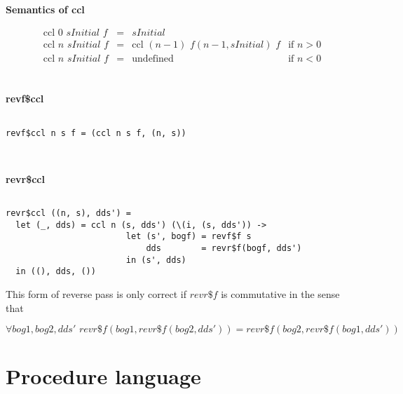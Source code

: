 \documentclass[sigplan,review]{acmart}
\newcommand{\lb}{\llbracket}
\newcommand{\rb}{\rrbracket}
\begin{document}
\begin{figure*}
  \begin{minipage}{\textwidth}
      {\bf Semantics of ccl}

      \newcommand{\gradS}[2]{\nabla_{#1}\lb #2 \rb}
      \newcommand{\gradV}[1]{\nabla#1}

\[
      \begin{array}{rcll}
        \mathrm{ccl} \,\, 0 \,\, sInitial \,\, f & = & sInitial \\
        \mathrm{ccl} \,\, n \,\, sInitial \,\, f & = &
        \mathrm{ccl} \,\, (n-1) \,\, f(n-1, sInitial) \,\, f & \textrm{if
          $n > 0$}\\
        \mathrm{ccl} \,\, n \,\, sInitial \,\, f & = &
        \mathrm{undefined} & \textrm{if $n < 0$}\\
      \end{array}
      \]
\\
\begin{minipage}{\textwidth}
      {\bf revf\$ccl}
\begin{verbatim}

revf$ccl n s f = (ccl n s f, (n, s))

\end{verbatim}
\end{minipage}
\\
\begin{minipage}{\textwidth}
      {\bf revr\$ccl}
\begin{verbatim}

revr$ccl ((n, s), dds') =
  let (_, dds) = ccl n (s, dds') (\(i, (s, dds')) ->
                        let (s', bogf) = revf$f s
                            dds        = revr$f(bogf, dds')
                        in (s', dds)
  in ((), dds, ())

\end{verbatim}

This form of reverse pass is only correct if $revr\$f$ is
commutative in the sense that

\[
\forall
bog1, bog2, dds' \,\,
revr\$f(bog1, revr\$f(bog2, dds'))
= revr\$f(bog2, revr\$f(bog1, dds'))
\]
\end{minipage}
\end{minipage}
\caption{Behaviour of ccl}
\end{figure*}

\section{Procedure language}
\end{document}
